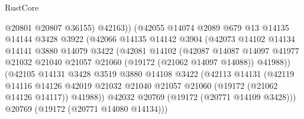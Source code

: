\begin{lexlean}{RustCore}
\begin{coremodule}
                                  @20801
                                  @20807
                                  @36155)
                                @42163))
                            (@42055
                              @14074
                              @2089
                              @679
                              @13
                              @14135
                              @14144
                              @3428
                              @3922
                              (@42066
                                @14135
                                @14142
                                @3904
                                (@42073
                                  @14102
                                  @14134
                                  @14141
                                  @3880
                                  @14079
                                  @3422
                                  (@42081
                                    @14102
                                    (@42087
                                      @14087
                                      @14097
                                      @41977
                                      @21032
                                      @21040
                                      @21057
                                      @21060
                                      (@19172 (@21062 @14097 @14088))
                                      @41988))
                                  (@42105
                                    @14131
                                    @3428
                                    @3519
                                    @3880
                                    @14108
                                    @3422
                                    (@42113
                                      @14131
                                      (@42119
                                        @14116
                                        @14126
                                        @42019
                                        @21032
                                        @21040
                                        @21057
                                        @21060
                                        (@19172 (@21062 @14126 @14117))
                                        @41988))
                                    @42032
                                    @20769
                                    (@19172 (@20771 @14109 @3428)))
                                  @20769
                                  (@19172 (@20771 @14080 @14134)))

\end{coremodule}
\end{lexlean}
